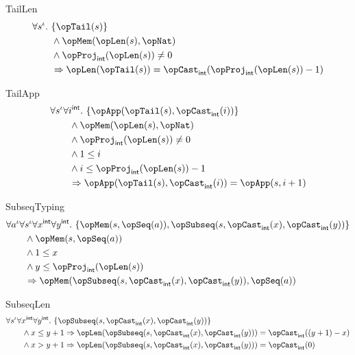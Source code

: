 \documentclass[11pt, a4paper, oneside]{article}
\begin{document}
\begin{axioms}
\item[TailLen] \[
        \begin{aligned}
            &\forall s^\idv.\, \st{ \opTail(s) } \\
            &\qquad \wedge \opMem(\opLen(s), \opNat) \\
            &\qquad \wedge \opProj_\int(\opLen(s)) \neq 0 \\
            &\qquad \imp \opLen(\opTail(s)) = \opCast_\int(\opProj_\int(\opLen(s)) - 1)
        \end{aligned}
    \]

\item[TailApp] \[
        \begin{aligned}
            &\forall s^\idv \forall i^\int.\, \st{ \opApp(\opTail(s), \opCast_\int(i)) } \\
            &\qquad \wedge \opMem(\opLen(s), \opNat) \\
            &\qquad \wedge \opProj_\int(\opLen(s)) \neq 0 \\
            &\qquad \wedge 1 \le i \\
            &\qquad \wedge i \le \opProj_\int(\opLen(s)) - 1 \\
            &\qquad \imp \opApp(\opTail(s), \opCast_\int(i)) = \opApp(s, i + 1)
        \end{aligned}
    \]

\item[SubseqTyping] \[
        \begin{aligned}
            &\forall a^\idv \forall s^\idv \forall x^\int \forall y^\int.\, \st{ \opMem(s, \opSeq(a)), \opSubseq(s, \opCast_\int(x), \opCast_\int(y)) } \\
            &\qquad \wedge \opMem(s, \opSeq(a)) \\
            &\qquad \wedge 1 \le x \\
            &\qquad \wedge y \le \opProj_\int(\opLen(s)) \\
            &\qquad \imp \opMem(\opSubseq(s, \opCast_\int(x), \opCast_\int(y)), \opSeq(a))
        \end{aligned}
    \]

\item[SubseqLen] \[
        \begin{aligned}
            &\forall s^\idv \forall x^\int \forall y^\int.\, \st{ \opSubseq(s, \opCast_\int(x), \opCast_\int(y)) } \\
            &\qquad \wedge x \le y + 1 \imp \opLen(\opSubseq(s, \opCast_\int(x), \opCast_\int(y))) = \opCast_\int((y + 1) - x) \\
            &\qquad \wedge x > y + 1 \imp \opLen(\opSubseq(s, \opCast_\int(x), \opCast_\int(y))) = \opCast_\int(0)
        \end{aligned}
    \]


\end{axioms}
\end{document}
